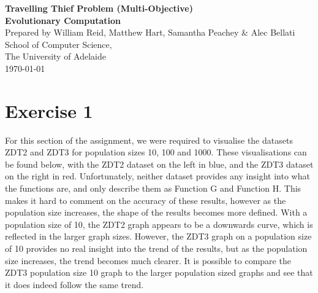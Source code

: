 \documentclass[a4paper,12pt]{article}
\begin{document}
\begin{center}
{\LARGE\bf Travelling Thief Problem (Multi-Objective)}\\
\vspace{0.5cm}
{\Large\bf Evolutionary Computation}\\
\vspace{1cm}
Prepared by William Reid, Matthew Hart, Samantha Peachey \& Alec Bellati\\
\vspace{1cm}
School of Computer Science,\\
The University of Adelaide\\
\vspace{1cm}
\today
\end{center}


\section*{Exercise 1}

For this section of the assignment, we were required to visualise the datasets ZDT2 and ZDT3 for population sizes 10, 100 and 1000. These visualisations can be found below, with the ZDT2 dataset on the left in blue, and the ZDT3 dataset on the right in red.  Unfortunately, neither dataset provides any insight into what the functions are, and only describe them as Function G and Function H. This makes it hard to comment on the accuracy of these results, however as the population size increases, the shape of the results becomes more defined. With a population size of 10, the ZDT2 graph appears to be a downwards curve, which is reflected in the larger graph sizes. However, the ZDT3 graph on a population size of 10 provides no real insight into the trend of the results, but as the population size increases, the trend becomes much clearer. It is possible to compare the ZDT3 population size 10 graph to the larger population sized graphs and see that it does indeed follow the same trend. 
\end{document}
